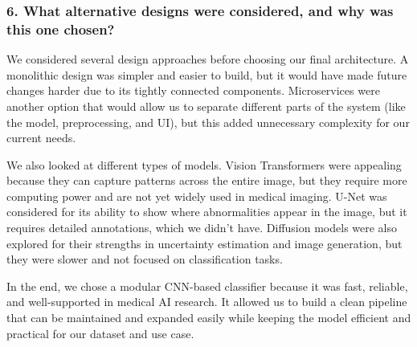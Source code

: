 \documentclass[12pt, titlepage]{article}
\begin{document}
\subsubsection{6. What alternative designs were considered, and why was this one chosen?}
\label{sec:alternativedesigns}

We considered several design approaches before choosing our final architecture. A monolithic design was simpler and easier to build, but it would have made future changes harder due to its tightly connected components. Microservices were another option that would allow us to separate different parts of the system (like the model, preprocessing, and UI), but this added unnecessary complexity for our current needs.

We also looked at different types of models. Vision Transformers were appealing because they can capture patterns across the entire image, but they require more computing power and are not yet widely used in medical imaging. U-Net was considered for its ability to show where abnormalities appear in the image, but it requires detailed annotations, which we didn't have. Diffusion models were also explored for their strengths in uncertainty estimation and image generation, but they were slower and not focused on classification tasks.

In the end, we chose a modular CNN-based classifier because it was fast, reliable, and well-supported in medical AI research. It allowed us to build a clean pipeline that can be maintained and expanded easily while keeping the model efficient and practical for our dataset and use case.
\end{document}
